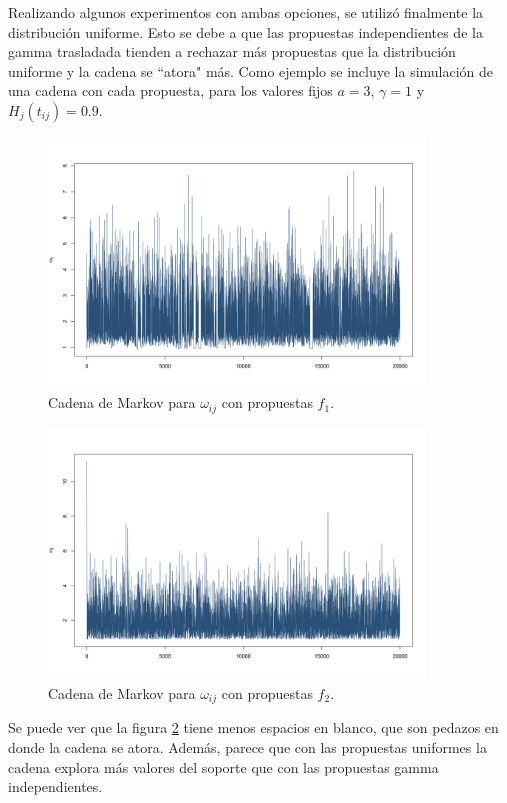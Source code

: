 \documentclass[11pt,a4paper]{article}
\begin{document}
Realizando algunos experimentos con ambas opciones, se utilizó finalmente la distribución uniforme. Esto se debe a que las propuestas independientes de la gamma trasladada tienden a rechazar más propuestas que la distribución uniforme y la cadena se ``atora" más. Como ejemplo se incluye la simulación de una cadena con cada propuesta, para los valores fijos $a = 3$, $\gamma = 1$ y $H_j(t_{ij}) = 0.9$.\\

\begin{figure}[h]
\centering\includegraphics[width=10cm]{propuesta_gamma.png}
\caption{Cadena de Markov para $\omega_{ij}$ con propuestas $f_1$.}
\label{fig:prop_gamma}
\end{figure}

\begin{figure}[h]
\centering\includegraphics[width=10cm]{propuesta_uniforme.png}
\caption{Cadena de Markov para $\omega_{ij}$ con propuestas $f_2$.}
\label{fig:prop_unif}
\end{figure}

Se puede ver que la figura \ref{fig:prop_unif} tiene menos espacios en blanco, que son pedazos en donde la cadena se atora. Además, parece que con las propuestas uniformes la cadena explora más valores del soporte que con las propuestas gamma independientes.\\
\end{document}
